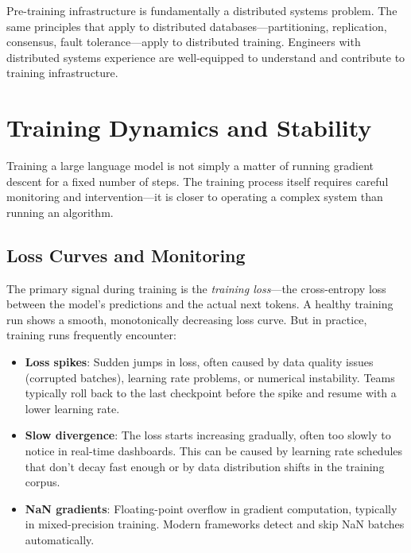 \begin{keytakeaway}
Pre-training infrastructure is fundamentally a distributed systems problem. The same principles that apply to distributed databases---partitioning, replication, consensus, fault tolerance---apply to distributed training. Engineers with distributed systems experience are well-equipped to understand and contribute to training infrastructure.
\end{keytakeaway}

\section{Training Dynamics and Stability}
\label{sec:training-dynamics}

Training a large language model is not simply a matter of running gradient descent for a fixed number of steps. The training process itself requires careful monitoring and intervention---it is closer to operating a complex system than running an algorithm.

\subsection{Loss Curves and Monitoring}

The primary signal during training is the \emph{training loss}---the cross-entropy loss between the model's predictions and the actual next tokens. A healthy training run shows a smooth, monotonically decreasing loss curve. But in practice, training runs frequently encounter:

\begin{itemize}[leftmargin=*]
    \item \textbf{Loss spikes}: Sudden jumps in loss, often caused by data quality issues (corrupted batches), learning rate problems, or numerical instability. Teams typically roll back to the last checkpoint before the spike and resume with a lower learning rate.
    \item \textbf{Slow divergence}: The loss starts increasing gradually, often too slowly to notice in real-time dashboards. This can be caused by learning rate schedules that don't decay fast enough or by data distribution shifts in the training corpus.
    \item \textbf{NaN gradients}: Floating-point overflow in gradient computation, typically in mixed-precision training. Modern frameworks detect and skip NaN batches automatically.
\end{itemize}

